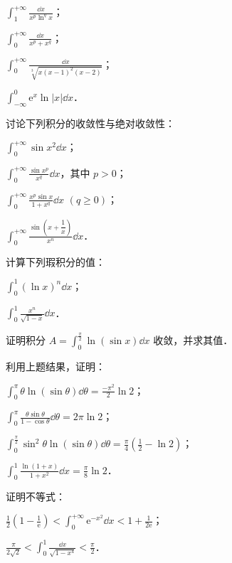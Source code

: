 \begin{xiti}
\begin{ziti}
\item $\displaystyle\int_{1}^{+\infty}\frac{\dd x}{x^{p}\ln^{q}x}$；
\item $\displaystyle\int_{0}^{+\infty}\frac{\dd x}{x^{p}+x^{q}}$；
\item $\displaystyle\int_{0}^{+\infty}\frac{\dd x}{\sqrt[3]{x(x-1)^{2}(x-2)}}$；
\item $\displaystyle\int_{-\infty}^{0}\mathrm{e}^{x}\ln\left|x\right|\dd x$．
\end{ziti}
\item 讨论下列积分的收敛性与绝对收敛性：
\begin{ziti}
\item $\displaystyle\int_{0}^{+\infty}\sin x^{2}\dd x$；
\item $\displaystyle\int_{0}^{+\infty}\frac{\sin x^{p}}{x^{q}}\dd x$，其中 $p>0$；
\item $\displaystyle\int_{0}^{+\infty}\frac{x^{p}\sin x}{1+x^{q}}\dd x$ $(q\geqslant 0)$；
\item $\displaystyle\int_{0}^{+\infty}\frac{\sin\left(x+\dfrac{1}{x}\right)}{x^{n}}\dd x$．
\end{ziti}
\item 计算下列瑕积分的值：
\begin{ziti}
\item $\displaystyle\int_{0}^{1}(\ln x)^{n}\dd x$；
\item $\displaystyle\int_{0}^{1}\frac{x^{n}}{\sqrt{1-x}}\dd x$．
\end{ziti}
\item 证明积分 $\displaystyle A=\int_{0}^{\frac{\pi}{2}}\ln(\sin x)\dd x$ 收敛，并求其值．
\item 利用上题结果，证明：
\begin{ziti}
\item $\displaystyle\int_{0}^{\pi}\theta\ln(\sin\theta)\dd\theta=\frac{-\pi^{2}}{2}\ln 2$；
\item $\displaystyle\int_{0}^{\pi}\frac{\theta\sin\theta}{1-\cos\theta}\dd\theta=2\pi\ln 2$；
\item $\displaystyle\int_{0}^{\frac{\pi}{2}}\sin^{2}\theta\ln(\sin\theta)\dd\theta=\frac{\pi}{4}\left(\frac{1}{2}-\ln 2\right)$；
\item $\displaystyle\int_{0}^{1}\frac{\ln(1+x)}{1+x^{2}}\dd x=\frac{\pi}{8}\ln 2$．
\end{ziti}
\item 证明不等式：
\begin{ziti}
\item $\displaystyle\frac{1}{2}\left(1-\frac{1}{\mathrm{e}}\right)<\int_{0}^{+\infty}\mathrm{e}^{-x^{2}}\dd x<1+\frac{1}{2\mathrm{e}}$；
\item $\displaystyle\frac{\pi}{2\sqrt{2}}<\int_{0}^{1}\frac{\dd x}{\sqrt{1-x^{4}}}<\frac{\pi}{2}$．
\end{ziti}
\end{xiti}
